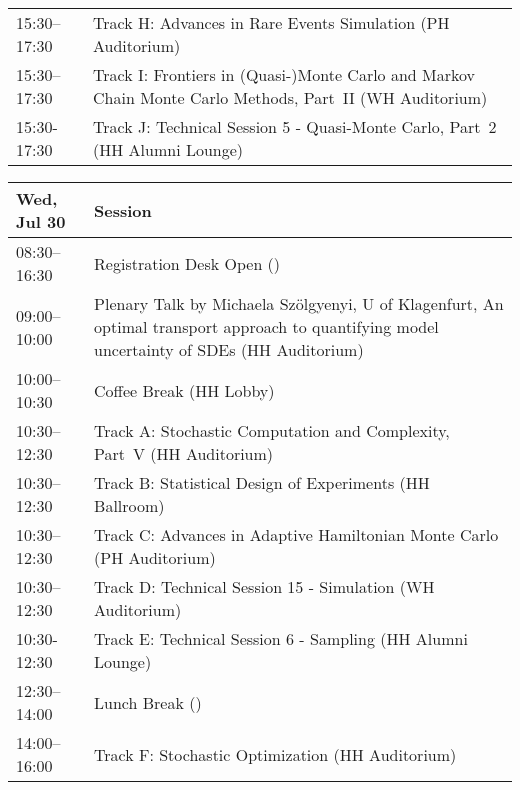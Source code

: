 \begin{table}
{\begin{tabularx}{\textwidth}{>{\hsize=0.32\hsize}X|>{\hsize=1.7\hsize}X}
\cellcolor{\SessionTitleColor}15:30–17:30 & \cellcolor{\SessionTitleColor}Track H: Advances in Rare Events Simulation (PH Auditorium) \\
\cellcolor{\SessionTitleColor}15:30–17:30 & \cellcolor{\SessionTitleColor}Track I: Frontiers in (Quasi-)Monte Carlo and Markov Chain Monte Carlo Methods, Part~II (WH Auditorium) \\
\cellcolor{\SessionLightColor}15:30-17:30 & \cellcolor{\SessionLightColor}Track J: Technical Session 5 - Quasi-Monte Carlo, Part~2 (HH Alumni Lounge) \\
\hline
\end{tabularx}
}
\end{table}

\begin{table}
{\footnotesize
\begin{tabularx}{\textwidth}{>{\hsize=0.32\hsize}X|>{\hsize=1.7\hsize}X}
\hline
\textbf{Wed, Jul 30} & \textbf{Session} \\
\hline
\cellcolor{\EmptyColor}08:30–16:30 & \cellcolor{\EmptyColor}Registration Desk Open () \\
\cellcolor{\PlenaryColor}09:00–10:00 & \cellcolor{\PlenaryColor}Plenary Talk by Michaela Szölgyenyi, U of Klagenfurt, An optimal transport approach to quantifying model uncertainty of SDEs (HH Auditorium) \\
\cellcolor{\EmptyColor}10:00–10:30 & \cellcolor{\EmptyColor}Coffee Break (HH Lobby) \\
\cellcolor{\SessionTitleColor}10:30–12:30 & \cellcolor{\SessionTitleColor}Track A: Stochastic Computation and Complexity, Part~V (HH Auditorium) \\
\cellcolor{\SessionTitleColor}10:30–12:30 & \cellcolor{\SessionTitleColor}Track B: Statistical Design of Experiments (HH Ballroom) \\
\cellcolor{\SessionTitleColor}10:30–12:30 & \cellcolor{\SessionTitleColor}Track C: Advances in Adaptive Hamiltonian Monte Carlo (PH Auditorium) \\
\cellcolor{\SessionLightColor}10:30–12:30 & \cellcolor{\SessionLightColor}Track D: Technical Session 15 - Simulation (WH Auditorium) \\
\cellcolor{\SessionLightColor}10:30-12:30 & \cellcolor{\SessionLightColor}Track E: Technical Session 6 - Sampling (HH Alumni Lounge) \\
\cellcolor{\EmptyColor}12:30–14:00 & \cellcolor{\EmptyColor}Lunch Break () \\
\cellcolor{\SessionTitleColor}14:00–16:00 & \cellcolor{\SessionTitleColor}Track F: Stochastic Optimization (HH Auditorium) \\

\end{tabularx}}
\end{table}
